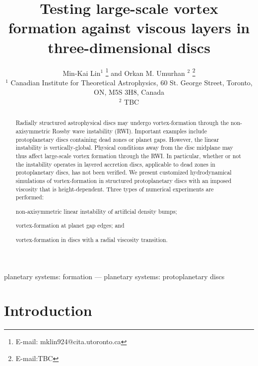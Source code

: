 \documentclass[useAMS,usenatbib]{mn2e}
\title[Vortex formation in viscous discs]{Testing large-scale 
  vortex formation against viscous layers in three-dimensional discs}
\author[Lin and Umurhan]{ Min-Kai Lin$^1$
  \thanks{E-mail: mklin924@cita.utoronto.ca} and Orkan M. Umurhan $^2$ \thanks{E-mail:TBC} \\
  $^1$ Canadian Institute for Theoretical Astrophysics,
  60 St. George Street, Toronto, ON, M5S 3H8, Canada \\
  $^2$ TBC
}
\begin{document}
\maketitle
\begin{abstract}
  Radially structured astrophysical discs may undergo vortex-formation
  through the non-axisymmetric Rossby wave instability (RWI). 
  Important examples include protoplanetary discs containing dead
  zones or planet gaps. However, the linear instability is
  vertically-global. Physical conditions away from the disc midplane
  may thus affect large-scale vortex formation through the RWI. In
  particular, whether or not the instability operates in layered
  accretion discs, applicable to dead zones in protoplanetary discs,
  has not been verified. We present customized hydrodynamical
  simulations of vortex-formation in structured protoplanetary discs
  with an imposed viscosity that is height-dependent. Three types of numerical
  experiments are performed:
  \begin{inparaenum}[(i)]
  \item non-axisymmetric linear instability of artificial
    density bumps;  
  \item vortex-formation at planet gap edges; and 
  \item vortex-formation in discs with a radial viscosity transition.
  \end{inparaenum}
\end{abstract}

\begin{keywords}
planetary systems: formation --- planetary systems:
protoplanetary discs
\end{keywords}


\section{Introduction}\label{intro}











 \appendix
% 
%
\end{document}
